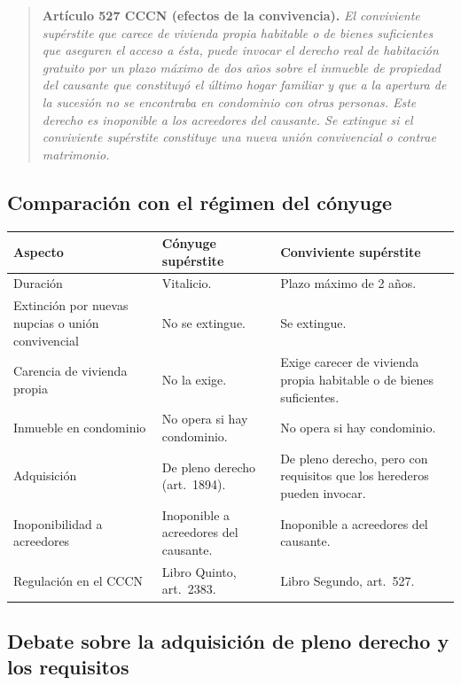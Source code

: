\documentclass[12pt,oneside]{book}
\begin{document}
\begin{quote}
\textbf{Artículo 527 CCCN (efectos de la convivencia).} \textit{El conviviente supérstite que carece de vivienda propia habitable o de bienes suficientes que aseguren el acceso a ésta, puede invocar el derecho real de habitación gratuito por un plazo máximo de dos años sobre el inmueble de propiedad del causante que constituyó el último hogar familiar y que a la apertura de la sucesión no se encontraba en condominio con otras personas. Este derecho es inoponible a los acreedores del causante. Se extingue si el conviviente supérstite constituye una nueva unión convivencial o contrae matrimonio.}
\end{quote}

\subsection{Comparación con el régimen del cónyuge}

\begin{table}[H]
\centering
\begin{tabularx}{\textwidth}{@{}>{\raggedright\arraybackslash}p{}>{\raggedright\arraybackslash}X>{\raggedright\arraybackslash}X@{}}
\toprule
\textbf{Aspecto} & \textbf{Cónyuge supérstite} & \textbf{Conviviente supérstite} \\
\midrule
Duración & Vitalicio. & Plazo máximo de 2 años. \\
Extinción por nuevas nupcias o unión convivencial & No se extingue. & Se extingue. \\
Carencia de vivienda propia & No la exige. & Exige carecer de vivienda propia habitable o de bienes suficientes. \\
Inmueble en condominio & No opera si hay condominio. & No opera si hay condominio. \\
Adquisición & De pleno derecho (art.~1894). & De pleno derecho, pero con requisitos que los herederos pueden invocar. \\
Inoponibilidad a acreedores & Inoponible a acreedores del causante. & Inoponible a acreedores del causante. \\
Regulación en el CCCN & Libro Quinto, art.~2383. & Libro Segundo, art.~527. \\
\bottomrule
\end{tabularx}
\end{table}

\subsection{Debate sobre la adquisición de pleno derecho y los requisitos}
\end{document}
